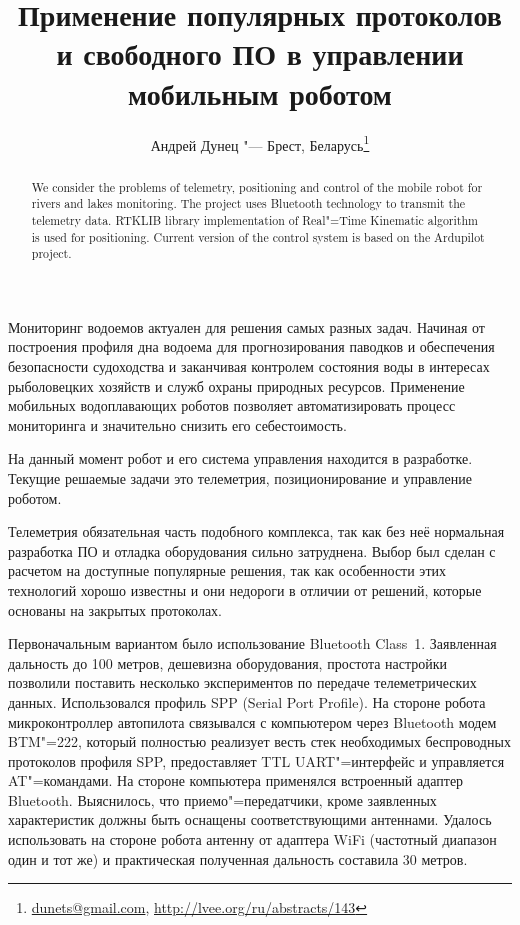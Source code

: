 \documentclass[10pt, a5paper]{article}
\begin{document}
\title{Применение популярных протоколов и свободного ПО в управлении мобильным роботом}
\author{Андрей Дунец "--- Брест, Беларусь\footnote{\url{dunets@gmail.com}, \url{http://lvee.org/ru/abstracts/143}}}
\maketitle
\begin{abstract}
We consider the problems of telemetry, positioning and cont\-rol of the mobile robot for rivers and lakes monitoring. The project uses Bluetooth technology to transmit the telemetry data. RTKLIB library implementation of Real"=Time Kinematic algo\-rithm is used for positioning. Current version of the control system is based on the Ardupilot project.
\end{abstract}
Мониторинг водоемов актуален для решения самых разных задач. Начиная от построения профиля дна водоема для прогнозирования паводков и обеспечения безопасности судоходства и заканчивая контролем состояния воды в интересах рыболовецких хозяйств и служб охраны природных ресурсов. Применение мобильных водоплавающих роботов позволяет автоматизировать процесс мониторинга и значительно снизить его себестоимость.

На данный момент робот и его система управления находится в разработке. Текущие решаемые задачи это телеметрия, позиционирование и управление роботом.

Телеметрия обязательная часть подобного комплекса, так как без неё нормальная разработка ПО и отладка оборудования сильно затруднена. Выбор был сделан с расчетом на доступные популярные решения, так как особенности этих технологий хорошо известны и они недороги в отличии от решений, которые основаны на закрытых протоколах.

Первоначальным вариантом было использование Bluetooth \linebreak Class~1. Заявленная дальность до 100 метров, дешевизна оборудования, простота настройки позволили поставить несколько экспериментов по передаче телеметрических данных. Использовался профиль SPP (Serial Port Profile). На стороне робота микроконтроллер автопилота связывался с компьютером через Bluetooth модем BTM"=222, который полностью реализует весть стек необходимых беспроводных протоколов профиля SPP, предоставляет TTL UART"=интерфейс и управляется AT"=командами. На стороне компьютера применялся встроенный адаптер Bluetooth. Выяснилось, что приемо"=передатчики, кроме заявленных характеристик должны быть оснащены соответствующими антеннами. Удалось использовать на стороне робота антенну от адаптера WiFi (частотный диапазон один и тот же) и практическая полученная дальность составила 30 метров.
\end{document}
